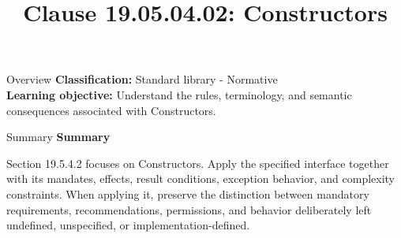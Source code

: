 \documentclass[10pt,letterpaper]{article}
\title{Clause 19.05.04.02: Constructors}
\author{}
\date{}
\begin{document}
\maketitle
\begin{CornellOverviewBox}{Overview}
\textbf{Classification:} Standard library - Normative\\[2pt]
\textbf{Learning objective:} Understand the rules, terminology, and semantic consequences associated with Constructors.
\end{CornellOverviewBox}\begin{CornellSummaryBox}{Summary}
{\sffamily\bfseries\color{Accent} Summary}\par\vspace{3pt}Section 19.5.4.2 focuses on Constructors. Apply the specified interface together with its mandates, effects, result conditions, exception behavior, and complexity constraints. When applying it, preserve the distinction between mandatory requirements, recommendations, permissions, and behavior deliberately left undefined, unspecified, or implementation-defined.
\end{CornellSummaryBox}
\end{document}
